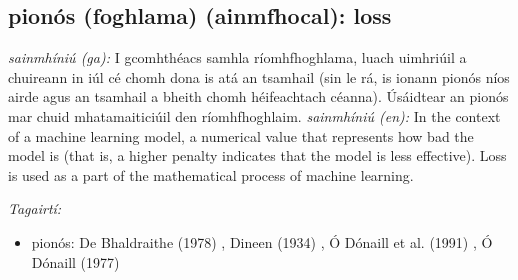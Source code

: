 \documentclass{article}
\begin{document}
\subsection*{pionós (foghlama) (ainmfhocal): loss} 
 \noindent \textit{sainmhíniú (ga):} I gcomhthéacs samhla ríomhfhoghlama, luach uimhriúil a chuireann in iúl cé chomh dona is atá an tsamhail (sin le rá, is ionann pionós níos airde agus an tsamhail a bheith chomh héifeachtach céanna). Úsáidtear an pionós mar chuid mhatamaiticiúil den ríomhfhoghlaim.
\newline\newline
 \noindent \textit{sainmhíniú (en):} In the context of a machine learning model, a numerical value that represents how bad the model is (that is, a higher penalty indicates that the model is less effective). Loss is used as a part of the mathematical process of machine learning.
\newline

 \noindent \textit{Tagairtí:}
\begin{itemize}
	\item pionós: De Bhaldraithe (1978) \cite{de-bhaldraithe}, Dineen (1934) \cite{dineen}, Ó Dónaill et al. (1991) \cite{focloir-beag}, Ó Dónaill (1977) \cite{odonaill}
\end{itemize}
\end{document}
